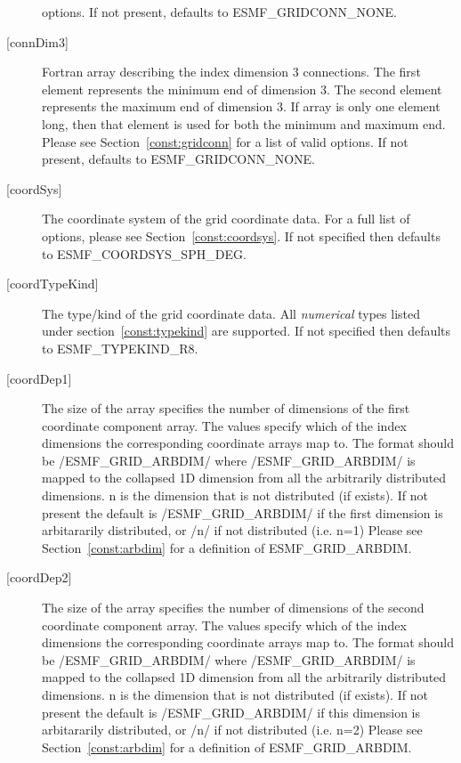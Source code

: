 \begin{description}
        options. If not present, defaults to ESMF\_GRIDCONN\_NONE.
   \item[{[connDim3]}]
        Fortran array describing the index dimension 3 connections.
        The first element represents the minimum end of dimension 3.
        The second element represents the maximum end of dimension 3.
        If array is only one element long, then that element is used
        for both the minimum and maximum end.
        Please see Section~\ref{const:gridconn} for a list of valid
        options. If not present, defaults to ESMF\_GRIDCONN\_NONE.
   \item[{[coordSys]}]
       The coordinate system of the grid coordinate data.
       For a full list of options, please see Section~\ref{const:coordsys}.
       If not specified then defaults to ESMF\_COORDSYS\_SPH\_DEG.
   \item[{[coordTypeKind]}]
       The type/kind of the grid coordinate data. All {\em numerical} types
       listed under section~\ref{const:typekind} are supported.
       If not specified then defaults to ESMF\_TYPEKIND\_R8.
   \item[{[coordDep1]}]
       The size of the array specifies the number of dimensions of the
       first coordinate component array. The values specify which
       of the index dimensions the corresponding coordinate
       arrays map to. The format should be /ESMF\_GRID\_ARBDIM/ where
       /ESMF\_GRID\_ARBDIM/ is mapped to the collapsed 1D dimension from all
       the arbitrarily distributed dimensions.  n is the dimension that
       is not distributed (if exists).
       If not present the default is /ESMF\_GRID\_ARBDIM/ if the first dimension
       is arbitararily distributed, or /n/ if not distributed (i.e. n=1)
        Please see Section~\ref{const:arbdim} for a definition of ESMF\_GRID\_ARBDIM.
   \item[{[coordDep2]}]
       The size of the array specifies the number of dimensions of the
       second coordinate component array. The values specify which
       of the index dimensions the corresponding coordinate
       arrays map to. The format should be /ESMF\_GRID\_ARBDIM/ where
       /ESMF\_GRID\_ARBDIM/ is mapped to the collapsed 1D dimension from all
       the arbitrarily distributed dimensions.  n is the dimension that
       is not distributed (if exists).
       If not present the default is /ESMF\_GRID\_ARBDIM/ if this dimension
       is arbitararily distributed, or /n/ if not distributed (i.e. n=2)
       Please see Section~\ref{const:arbdim} for a definition of ESMF\_GRID\_ARBDIM.

\end{description}
